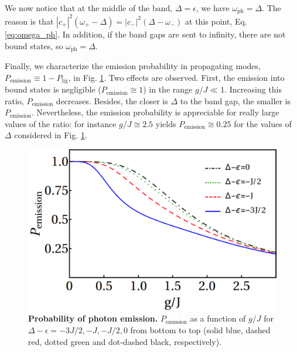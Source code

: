\documentclass[aps,pra,twocolumn,floatfix,superscriptaddress]{revtex4-1}%
\begin{document}
{\color{blue}We now notice that at the middle of the band, $\Delta=\epsilon$, we have $\omega_\text{ph}=\Delta$. The reason is that $|c_+|^2(\omega_+-\Delta)=|c_-|^2(\Delta-\omega_-)$ at this point, Eq. \eqref{eq:omega_ph}. In addition, if the band gaps are sent to infinity, there are not bound states, so $\omega_\text{ph}=\Delta$.}

Finally, we characterize the emission probability in propagating modes, $P_\text{emission}\equiv 1-P_\text{lig}$, in Fig. \ref{fig:P_emi}. Two effects are observed. First, the emission into bound states is negligible ($P_\text{emission} \cong 1$) in the range $g/J \ll1$. Increasing this ratio, $P_\text{emission}$ decreases. Besides, the closer is $\Delta$ to the band gap, the smaller is $P_\text{emission}$. Nevertheless, the emission probability is appreciable for really large values of the ratio: for instance $g/J \cong 2.5$ yields $P_\text{emission} \cong 0.25$ for the values of $\Delta$ considered in Fig. \ref{fig:P_emi}.

\begin{figure}[thb!]
\includegraphics[width=1.0\columnwidth]{p_emission_a.pdf}
\caption{{\bf Probability of photon emission.} $P_\text{emission}$ as a function of $g/J$ for $\Delta-\epsilon=-3J/2,-J,-J/2,0$ from bottom to top (solid blue, dashed red, dotted green and dot-dashed black, respectively).}\label{fig:P_emi}
\end{figure}
\end{document}
